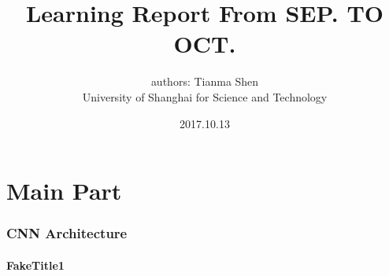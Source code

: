 \documentclass[10pt,fleqn]{beamer}
\author[authors: Tianma Shen]{authors: Tianma Shen\\[5pt]\scriptsize{University of Shanghai for Science and Technology}}%
\title[Learning Report ]{Learning Report From SEP. TO OCT.}%
\institute{%
\small{}} %
\date[2017.9]{2017.10.13} %
\begin{document}
	\frame[plain]{\titlepage}

	\part{Main Part}

	\section{CNN Architecture}%
	\subsection{FakeTitle1} %
	
	
	
	
	
	
	
	
	
	
	
\end{document}
